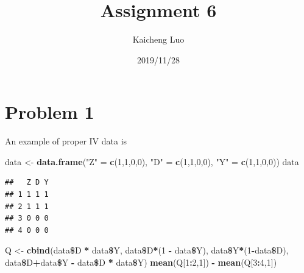 \documentclass[]{article}
\title{Assignment 6}
\author{Kaicheng Luo}
\date{2019/11/28}
\newenvironment{Shaded}{\begin{snugshade}}{\end{snugshade}}
\newcommand{\KeywordTok}[1]{\textcolor[rgb]{0.13,0.29,0.53}{\textbf{#1}}}
\newcommand{\DecValTok}[1]{\textcolor[rgb]{0.00,0.00,0.81}{#1}}
\newcommand{\StringTok}[1]{\textcolor[rgb]{0.31,0.60,0.02}{#1}}
\newcommand{\OperatorTok}[1]{\textcolor[rgb]{0.81,0.36,0.00}{\textbf{#1}}}
\newcommand{\NormalTok}[1]{#1}
\begin{document}
\maketitle

\section*{Problem 1}

An example of proper IV data is

\begin{Shaded}
\begin{Highlighting}[]
\NormalTok{data <-}\StringTok{ }\KeywordTok{data.frame}\NormalTok{(}\StringTok{"Z"}\NormalTok{ =}\StringTok{ }\KeywordTok{c}\NormalTok{(}\DecValTok{1}\NormalTok{,}\DecValTok{1}\NormalTok{,}\DecValTok{0}\NormalTok{,}\DecValTok{0}\NormalTok{), }\StringTok{"D"}\NormalTok{ =}\StringTok{ }\KeywordTok{c}\NormalTok{(}\DecValTok{1}\NormalTok{,}\DecValTok{1}\NormalTok{,}\DecValTok{0}\NormalTok{,}\DecValTok{0}\NormalTok{), }\StringTok{"Y"}\NormalTok{ =}\StringTok{ }\KeywordTok{c}\NormalTok{(}\DecValTok{1}\NormalTok{,}\DecValTok{1}\NormalTok{,}\DecValTok{0}\NormalTok{,}\DecValTok{0}\NormalTok{))}
\NormalTok{data}
\end{Highlighting}
\end{Shaded}

\begin{verbatim}
##   Z D Y
## 1 1 1 1
## 2 1 1 1
## 3 0 0 0
## 4 0 0 0
\end{verbatim}

\begin{Shaded}
\begin{Highlighting}[]
\NormalTok{Q <-}\StringTok{ }\KeywordTok{cbind}\NormalTok{(data}\OperatorTok{\$}\NormalTok{D }\OperatorTok{*}\StringTok{ }\NormalTok{data}\OperatorTok{\$}\NormalTok{Y, data}\OperatorTok{\$}\NormalTok{D}\OperatorTok{*}\NormalTok{(}\DecValTok{1} \OperatorTok{-}\StringTok{ }\NormalTok{data}\OperatorTok{\$}\NormalTok{Y), data}\OperatorTok{\$}\NormalTok{Y}\OperatorTok{*}\NormalTok{(}\DecValTok{1}\OperatorTok{-}\NormalTok{data}\OperatorTok{\$}\NormalTok{D), data}\OperatorTok{\$}\NormalTok{D}\OperatorTok{+}\NormalTok{data}\OperatorTok{\$}\NormalTok{Y }\OperatorTok{-}\StringTok{ }\NormalTok{data}\OperatorTok{\$}\NormalTok{D }\OperatorTok{*}\StringTok{ }\NormalTok{data}\OperatorTok{\$}\NormalTok{Y)}
\KeywordTok{mean}\NormalTok{(Q[}\DecValTok{1}\OperatorTok{:}\DecValTok{2}\NormalTok{,}\DecValTok{1}\NormalTok{]) }\OperatorTok{-}\StringTok{ }\KeywordTok{mean}\NormalTok{(Q[}\DecValTok{3}\OperatorTok{:}\DecValTok{4}\NormalTok{,}\DecValTok{1}\NormalTok{])}
\end{Highlighting}
\end{Shaded}
\end{document}
